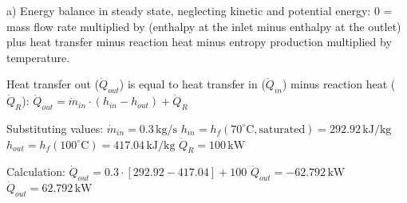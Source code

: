 a) Energy balance in steady state, neglecting kinetic and potential energy:  
0 = mass flow rate multiplied by (enthalpy at the inlet minus enthalpy at the outlet) plus heat transfer minus reaction heat minus entropy production multiplied by temperature.  

Heat transfer out (\( \dot{Q}_{out} \)) is equal to heat transfer in (\( \dot{Q}_{in} \)) minus reaction heat (\( \dot{Q}_R \)):  
\( \dot{Q}_{out} = \dot{m}_{in} \cdot (h_{in} - h_{out}) + \dot{Q}_R \)  

Substituting values:  
\( \dot{m}_{in} = 0.3 \, \text{kg/s} \)  
\( h_{in} = h_f(70^\circ \text{C}, \text{saturated}) = 292.92 \, \text{kJ/kg} \)  
\( h_{out} = h_f(100^\circ \text{C}) = 417.04 \, \text{kJ/kg} \)  
\( \dot{Q}_R = 100 \, \text{kW} \)  

Calculation:  
\( \dot{Q}_{out} = 0.3 \cdot [292.92 - 417.04] + 100 \)  
\( \dot{Q}_{out} = -62.792 \, \text{kW} \)  
\( \dot{Q}_{out} = 62.792 \, \text{kW} \)